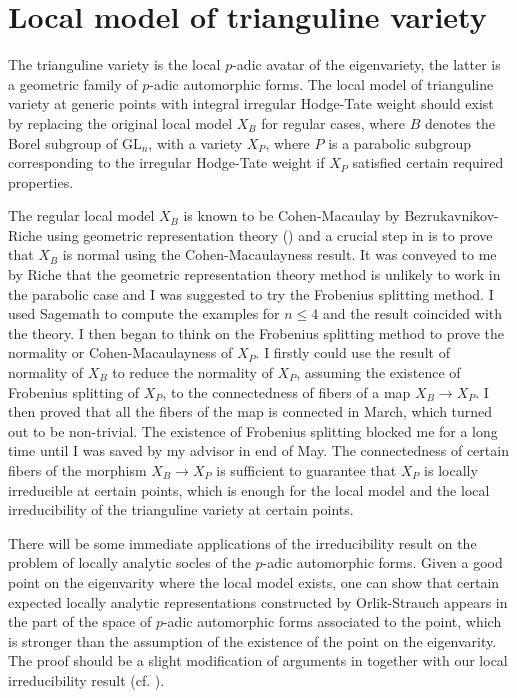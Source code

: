 \documentclass{amsart}
\newcommand{\GL}{\text{GL}}
\numberwithin{equation}{section}
\begin{document}
\section{Local model of trianguline variety}
The trianguline variety is the local $p$-adic avatar of the eigenvariety, the latter is a geometric family of $p$-adic automorphic forms. The local model of trianguline variety at generic points with integral irregular Hodge-Tate weight should exist by replacing the original local model $X_B$ for regular cases, where $B$ denotes the Borel subgroup of $\GL_n$, with a variety $X_P$, where $P$ is a parabolic subgroup corresponding to the irregular Hodge-Tate weight if $X_P$ satisfied certain required properties. \par
The regular local model $X_{B}$ is known to be Cohen-Macaulay by Bezrukavnikov-Riche using geometric representation theory (\cite{riche2008geometric}) and a crucial step in \cite{breuil2019local} is to prove that $X_B$ is normal using the Cohen-Macaulayness result. It was conveyed to me by Riche that the geometric representation theory method is unlikely to work in the parabolic case and I was suggested to try the Frobenius splitting method. I used Sagemath to compute the examples for $n\leq 4$ and the result coincided with the theory. I then began to think on the Frobenius splitting method to prove the normality or Cohen-Macaulayness of $X_P$. I firstly could use the result of normality of $X_B$ to reduce the normality of $X_P$, assuming the existence of Frobenius splitting of $X_P$, to the connectedness of fibers of a map $X_B\rightarrow X_P$. I then proved that all the fibers of the map is connected in March, which turned out to be non-trivial. The existence of Frobenius splitting blocked me for a long time until I was saved by my advisor in end of May. The connectedness of certain fibers of the morphism $X_B\rightarrow X_P$ is sufficient to guarantee that $X_P$ is locally irreducible at certain points, which is enough for the local model and the local irreducibility of the trianguline variety at certain points.\par
There will be some immediate applications of the irreducibility result on the problem of locally analytic socles of the $p$-adic automorphic forms. Given a good point on the eigenvarity where the local model exists, one can show that certain expected locally analytic representations constructed by Orlik-Strauch appears in the part of the space of $p$-adic automorphic forms associated to the point, which is stronger than the assumption of the existence of the point on the eigenvarity. The proof should be a slight modification of arguments in \cite{breuil2019local} together with our local irreducibility result (cf. \cite{Wu2020unibranch}).\par
\end{document}
